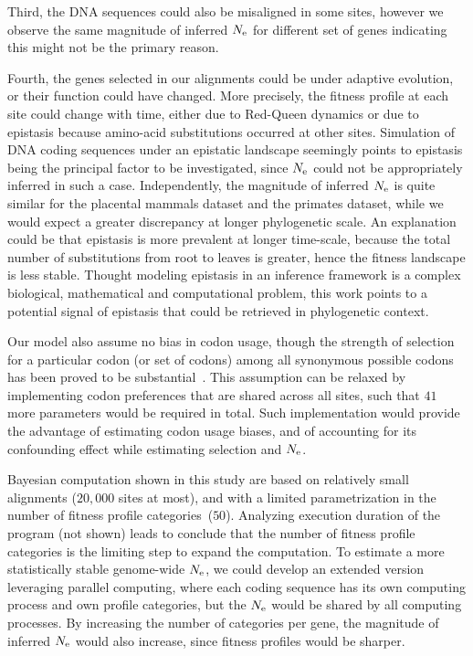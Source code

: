 Third, the \acrshort{DNA} sequences could also be misaligned in some sites, however we observe the same magnitude of inferred $N_{\mathrm{e}}$ for different set of genes indicating this might not be the primary reason.

Fourth, the genes selected in our alignments could be under adaptive evolution, or their function could have changed.
More precisely, the fitness profile at each site could change with time, either due to Red-Queen dynamics or due to epistasis because amino-acid \glspl{substitution} occurred at other sites.
Simulation of \acrshort{DNA} coding sequences under an epistatic landscape seemingly points to epistasis being the principal factor to be investigated, since $N_{\mathrm{e}}$ could not be appropriately inferred in such a case.
Independently, the magnitude of inferred $N_{\mathrm{e}}$ is quite similar for the placental mammals dataset and the primates dataset, while we would expect a greater discrepancy at longer phylogenetic scale.
An explanation could be that epistasis is more prevalent at longer time-scale, because the total number of \glspl{substitution} from root to leaves is greater, hence the fitness landscape is less stable.
Thought modeling epistasis in an inference framework is a complex biological, mathematical and computational problem, this work points to a potential signal of epistasis that could be retrieved in phylogenetic context.

Our model also assume no bias in \gls{codon} usage, though the strength of selection for a particular \gls{codon} (or set of codons) among all synonymous possible \glspl{codon} has been proved to be substantial~\citep{Yang2008,Plotkin2011}.
This assumption can be relaxed by implementing \gls{codon} preferences that are shared across all sites, such that $41$ more parameters would be required in total.
Such implementation would provide the advantage of estimating \gls{codon} usage biases, and of accounting for its confounding effect while estimating selection and $N_{\mathrm{e}}$.

Bayesian computation shown in this study are based on relatively small alignments ($20,000$ sites at most), and with a limited parametrization in the number of fitness profile categories~($50$).
Analyzing execution duration of the program (not shown) leads to conclude that the number of fitness profile categories is the limiting step to expand the computation.
To estimate a more statistically stable genome-wide $N_{\mathrm{e}}$, we could develop an extended version leveraging parallel computing, where each coding sequence has its own computing process and own profile categories, but the $N_{\mathrm{e}}$ would be shared by all computing processes.
By increasing the number of categories per gene, the magnitude of inferred $N_{\mathrm{e}}$ would also increase, since fitness profiles would be sharper.

